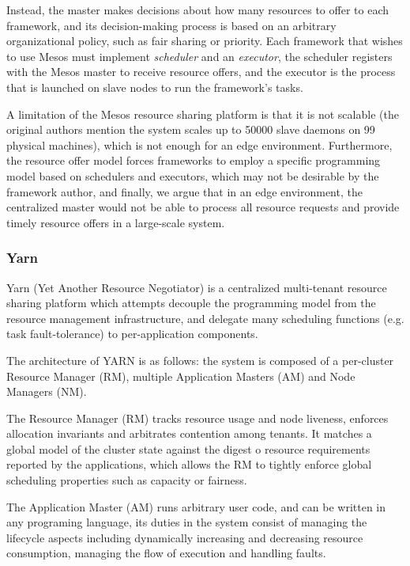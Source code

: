 Instead, the master makes decisions about how many resources to offer to each framework, and its decision-making process is based on an arbitrary organizational policy, such as fair sharing or priority. Each framework that wishes to use Mesos must implement \textit{scheduler} and an \textit{executor}, the scheduler registers with the Mesos master to receive resource offers, and the executor is the process that is launched on slave nodes to run the framework's tasks.

A limitation of the Mesos resource sharing platform is that it is not scalable (the original authors mention the system scales up to 50000 slave daemons on 99 physical machines), which is not enough for an edge environment. Furthermore, the resource offer model forces frameworks to employ a specific programming model based on schedulers and executors, which may not be desirable by the framework author, and finally, we argue that in an edge environment, the centralized master would not be able to process all resource requests and provide timely resource offers in a large-scale system.

\subsubsection{Yarn}

Yarn (Yet Another Resource Negotiator) \cite{Vavilapalli2013ApacheHY} is a centralized multi-tenant resource sharing platform which attempts decouple the programming model from the resource management infrastructure, and delegate many scheduling functions (e.g. task fault-tolerance) to per-application components. 

The architecture of YARN is as follows: the system is composed of a per-cluster Resource Manager (RM), multiple Application Masters (AM) and Node Managers (NM). 

The Resource Manager (RM) tracks resource usage and node liveness, enforces allocation invariants and arbitrates contention among tenants. It matches a global model of the cluster state against the digest o resource requirements reported by the applications, which allows the RM to tightly enforce global scheduling properties such as capacity or fairness.

The Application Master (AM) runs arbitrary user code, and can be written in any programing language, its duties in the system consist of managing the lifecycle aspects including dynamically increasing and decreasing resource consumption, managing the flow of execution and handling faults. 

